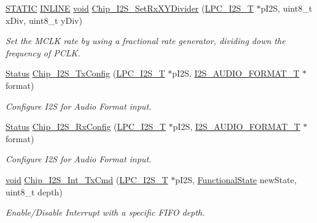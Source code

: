 \begin{DoxyCompactItemize}
\hyperlink{group__LPC__Types__Public__Macros_ga10b2d890d871e1489bb02b7e70d9bdfb}{S\-T\-A\-T\-I\-C} \hyperlink{group__LPC__Types__Public__Types_ga2eb6f9e0395b47b8d5e3eeae4fe0c116}{I\-N\-L\-I\-N\-E} \hyperlink{Paradigm_2Tern__EE_2small_2portmacro_8h_a14d32f8130d3c0b212cfc751730b5b49}{void} \hyperlink{group__I2S__17XX__40XX_gafd2bc55fb29ea5f082d5ae3b5794f605}{Chip\-\_\-\-I2\-S\-\_\-\-Set\-Rx\-X\-Y\-Divider} (\hyperlink{structLPC__I2S__T}{L\-P\-C\-\_\-\-I2\-S\-\_\-\-T} $\ast$p\-I2\-S, uint8\-\_\-t x\-Div, uint8\-\_\-t y\-Div)
\begin{DoxyCompactList}\small\item\em Set the M\-C\-L\-K rate by using a fractional rate generator, dividing down the frequency of P\-C\-L\-K. \end{DoxyCompactList}\item 
\hyperlink{group__LPC__Types__Public__Types_ga67a0db04d321a74b7e7fcfd3f1a3f70b}{Status} \hyperlink{group__I2S__17XX__40XX_ga09acfe336e9aee86f1d029146937326a}{Chip\-\_\-\-I2\-S\-\_\-\-Tx\-Config} (\hyperlink{structLPC__I2S__T}{L\-P\-C\-\_\-\-I2\-S\-\_\-\-T} $\ast$p\-I2\-S, \hyperlink{structI2S__AUDIO__FORMAT__T}{I2\-S\-\_\-\-A\-U\-D\-I\-O\-\_\-\-F\-O\-R\-M\-A\-T\-\_\-\-T} $\ast$format)
\begin{DoxyCompactList}\small\item\em Configure I2\-S for Audio Format input. \end{DoxyCompactList}\item 
\hyperlink{group__LPC__Types__Public__Types_ga67a0db04d321a74b7e7fcfd3f1a3f70b}{Status} \hyperlink{group__I2S__17XX__40XX_gab443fc12cad5f6cfb13dc5ab19a003ae}{Chip\-\_\-\-I2\-S\-\_\-\-Rx\-Config} (\hyperlink{structLPC__I2S__T}{L\-P\-C\-\_\-\-I2\-S\-\_\-\-T} $\ast$p\-I2\-S, \hyperlink{structI2S__AUDIO__FORMAT__T}{I2\-S\-\_\-\-A\-U\-D\-I\-O\-\_\-\-F\-O\-R\-M\-A\-T\-\_\-\-T} $\ast$format)
\begin{DoxyCompactList}\small\item\em Configure I2\-S for Audio Format input. \end{DoxyCompactList}\item 
\hyperlink{Paradigm_2Tern__EE_2small_2portmacro_8h_a14d32f8130d3c0b212cfc751730b5b49}{void} \hyperlink{group__I2S__17XX__40XX_gaf5ea5a92372f64937b2a967f8aa284f3}{Chip\-\_\-\-I2\-S\-\_\-\-Int\-\_\-\-Tx\-Cmd} (\hyperlink{structLPC__I2S__T}{L\-P\-C\-\_\-\-I2\-S\-\_\-\-T} $\ast$p\-I2\-S, \hyperlink{group__LPC__Types__Public__Types_gac9a7e9a35d2513ec15c3b537aaa4fba1}{Functional\-State} new\-State, uint8\-\_\-t depth)
\begin{DoxyCompactList}\small\item\em Enable/\-Disable Interrupt with a specific F\-I\-F\-O depth. \end{DoxyCompactList}\item 

\end{DoxyCompactItemize}
